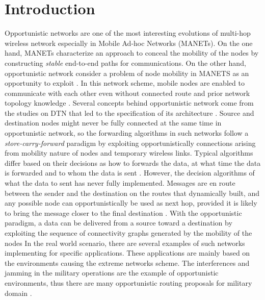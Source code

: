 \chapter{Introduction}
\label{intro}

Opportunistic networks are one of the most interesting evolutions of multi-hop wireless network especially in Mobile Ad-hoc Networks (MANETs).
On the one hand, MANETs characterize an approach to conceal the mobility of the nodes by constructing \emph{stable} end-to-end paths for communications. 
On the other hand, opportunistic network consider a problem of node mobility in MANETS as an opportunity to exploit \cite{Conti2014}.
In this network scheme, mobile nodes are enabled to communicate with each other even without connected route and prior network topology knowledge \cite{Pelusi2006}.
Several concepts behind opportunistic network come from the studies on DTN that led to the specification of its architecture \cite{Conan2008,Yu2012,Rongxing2010,Schurgot2012}. 
Source and destination nodes might never be fully connected at the same time in opportunistic network, so the forwarding algorithms in such networks follow a \emph{store-carry-forward} paradigm \cite{Yamamura2011,Jie2007,Jie2007a} by exploiting opportunistically connections arising from mobility nature of nodes and temporary wireless links. 
Typical algorithms differ based on their decisions as how to forwards the data, at what time the data is forwarded and to whom the data is sent \cite{Joe2010}. 
However, the decision algorithms of what the data to sent has never fully implemented. 
Messages are en route between the sender and the destination on the routes that dynamically built, and any possible node can opportunistically be used as next hop, provided it is likely to bring the message closer to the final destination .
With the opportunistic paradigm, a data can be delivered from a source toward a destination by exploiting the sequence of connectivity graphs generated by the mobility of the nodes \cite{Acer20111,Ferretti2013}
In the real world scenario, there are several examples of such networks implementing for specific applications. 
These applications are mainly based on the environments causing the extreme networks scheme.
The interferences and jamming in the military operations are the example of opportunistic environments, thus there are many opportunistic routing proposals for military domain \cite{Kerdsri2012a,Scott2005,Kidston2012,Haillot2009}.




